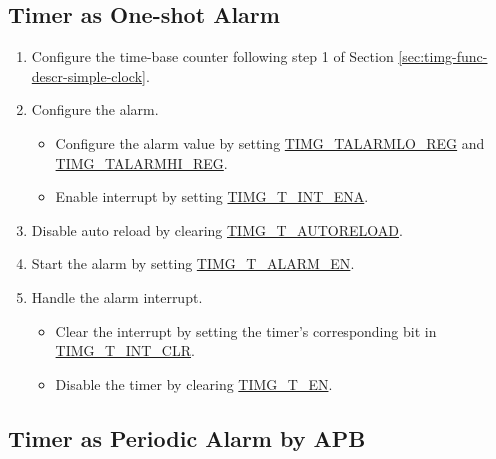 \documentclass[main\_\_EN.tex]{subfiles}
\begin{document}
\subsection{Timer as One-shot Alarm}\label{sec:timg-func-descr-timer-alarm}
\begin{enumerate}
    \item Configure the time-base counter following step 1 of Section \ref{sec:timg-func-descr-simple-clock}.
    \item Configure the alarm.
    \begin{itemize}
        \item Configure the alarm value by setting \hyperref[regdesc:TIMGTXALARMLOREG]{TIMG\_TALARMLO\_REG} and \hyperref[regdesc:TIMGTXALARMHIREG]{TIMG\_TALARMHI\_REG}.
        \item Enable interrupt by setting  \hyperref[fielddesc:TIMGTXINTENA]{TIMG\_T\_INT\_ENA}.
    \end{itemize}
    \item Disable auto reload by clearing \hyperref[fielddesc:TIMGTXAUTORELOAD]{TIMG\_T\_AUTORELOAD}.
    \item Start the alarm by setting \hyperref[fielddesc:TIMGTXALARMEN]{TIMG\_T\_ALARM\_EN}.
    \item Handle the alarm interrupt.
    \begin{itemize}
        \item Clear the interrupt by setting the timer's corresponding bit in \hyperref[fielddesc:TIMGTXINTCLR]{TIMG\_T\_INT\_CLR}.
        \item Disable the timer by clearing \hyperref[fielddesc:TIMGTXEN]{TIMG\_T\_EN}.
    \end{itemize}
\end{enumerate}

\subsection{Timer as Periodic Alarm by APB}
\end{document}
